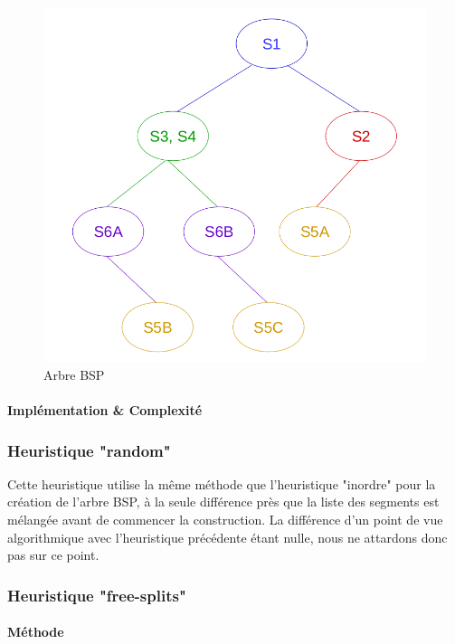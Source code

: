 \documentclass[11pt,a4paper]{article}
\begin{document}
\begin{figure}[!h]
\centering
\includegraphics[scale=0.35]{bsp_ex_3.png}
\caption{Arbre BSP}
\label{bsp_tree}
\end{figure}

\paragraph{Implémentation \& Complexité}

\subsubsection{Heuristique "random"}

Cette heuristique utilise la même méthode que l'heuristique "inordre" pour la création de l'arbre BSP, à la seule différence près que la liste des segments est mélangée avant de commencer la construction. La différence d'un point de vue algorithmique avec l'heuristique précédente étant nulle, nous ne attardons donc pas sur ce point. 

\subsubsection{Heuristique "free-splits"}

\paragraph{Méthode}
\end{document}
